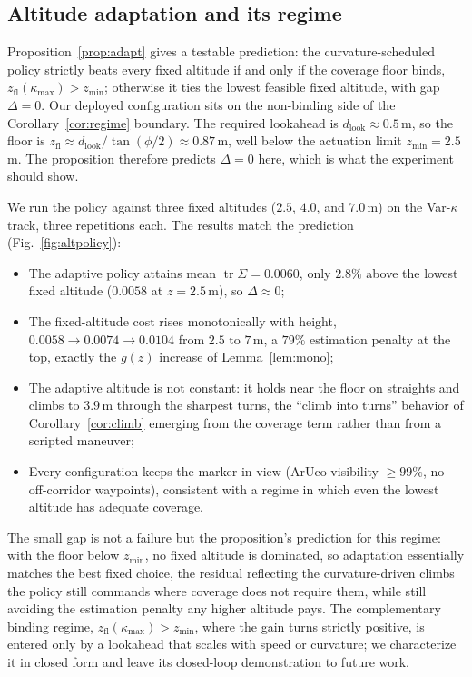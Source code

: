 \documentclass{ifacconf}
\DeclareMathOperator{\tr}{tr}
\begin{document}
\subsection{Altitude adaptation and its regime}
\label{sec:res_adapt}
Proposition~\ref{prop:adapt} gives a testable prediction: the curvature-scheduled policy strictly
beats every fixed altitude if and only if the coverage floor binds, $z_{\mathrm{fl}}(\kappa_{\max})>
z_{\min}$; otherwise it ties the lowest feasible fixed altitude, with gap $\Delta=0$. Our deployed
configuration sits on the non-binding side of the Corollary~\ref{cor:regime} boundary. The required
lookahead is $d_{\mathrm{look}}\approx0.5$\,m, so the floor is
$z_{\mathrm{fl}}\approx d_{\mathrm{look}}/\tan(\phi/2)\approx0.87$\,m, well below the actuation limit
$z_{\min}=2.5$\,m. The proposition therefore predicts $\Delta=0$ here, which is what the experiment
should show.

We run the policy against three fixed altitudes ($2.5$, $4.0$, and $7.0$\,m) on the Var-$\kappa$ track,
three repetitions each. The results match the prediction (Fig.~\ref{fig:altpolicy}):
\begin{itemize}
\item The adaptive policy attains mean $\tr\Sigma=0.0060$, only $2.8\%$ above the lowest fixed
altitude ($0.0058$ at $z=2.5$\,m), so $\Delta\approx0$;
\item The fixed-altitude cost rises monotonically with height, $0.0058\to0.0074\to0.0104$ from $2.5$ to
$7$\,m, a $79\%$ estimation penalty at the top, exactly the $g(z)$ increase of Lemma~\ref{lem:mono};
\item The adaptive altitude is not constant: it holds near the floor on straights and climbs to $3.9$\,m
through the sharpest turns, the ``climb into turns'' behavior of Corollary~\ref{cor:climb} emerging from
the coverage term rather than from a scripted maneuver;
\item Every configuration keeps the marker in view (ArUco visibility $\ge99\%$, no off-corridor
waypoints), consistent with a regime in which even the lowest altitude has adequate coverage.
\end{itemize}
The small gap is not a failure but the proposition's prediction for this regime: with the floor below
$z_{\min}$, no fixed altitude is dominated, so adaptation essentially matches the best fixed choice, the
residual reflecting the curvature-driven climbs the policy still commands where coverage does not require
them, while still avoiding the estimation penalty any higher altitude pays. The complementary binding regime,
$z_{\mathrm{fl}}(\kappa_{\max})>z_{\min}$, where the gain turns strictly positive, is entered only by a
lookahead that scales with speed or curvature; we characterize it in closed form and leave its closed-loop
demonstration to future work.
\end{document}
